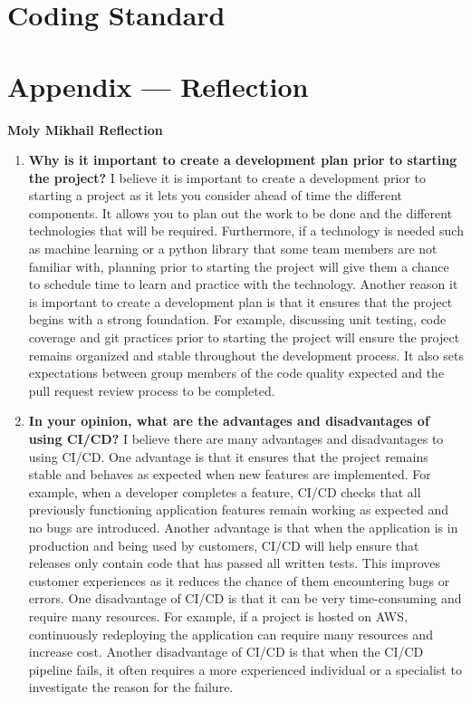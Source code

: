 \documentclass{article}
\begin{document}
\section{Coding Standard}


\newpage{}

\section*{Appendix --- Reflection}





\textbf{Moly Mikhail Reflection}
\begin{enumerate}
    \item  \textbf{Why is it important to create a development plan prior to starting the
    project?} \newline
    I believe it is important to create a development prior to starting a project as it lets you consider ahead of time the different 
    components. It allows you to plan out the work to be done and the different technologies that will be required. Furthermore, if a technology 
    is needed such as machine learning or a python library that some team members are not familiar with, planning prior to starting the project will give
    them a chance to schedule time to learn and practice with the technology. Another reason it is important to create a development plan is that it ensures that the project begins with a strong foundation.
    For example, discussing unit testing, code coverage and git practices prior to starting the project will ensure the project remains organized and stable throughout the development process. It also sets 
    expectations between group members of the code quality expected and the pull request review process to be completed.
    
    \item \textbf{In your opinion, what are the advantages and disadvantages of using
    CI/CD?} \newline
    I believe there are many advantages and disadvantages to using CI/CD. One advantage is that it ensures that the project remains stable and behaves as expected when new features are implemented. 
    For example, when a developer completes a feature, CI/CD checks that all previously functioning application features remain working as expected and no bugs are introduced. Another advantage
    is that when the application is in production and being used by customers, CI/CD will help ensure that releases only contain code that has passed all written tests.  This improves customer experiences
    as it reduces the chance of them encountering bugs or errors.  
    One disadvantage of CI/CD is that it can be very time-consuming and require many resources. For example, if a project is hosted on AWS, continuously redeploying the application
    can require many resources and increase cost. Another disadvantage of CI/CD is that when the CI/CD pipeline fails, it often requires a more 
    experienced individual or a specialist to investigate the reason for the failure.


\end{enumerate}
\end{document}
